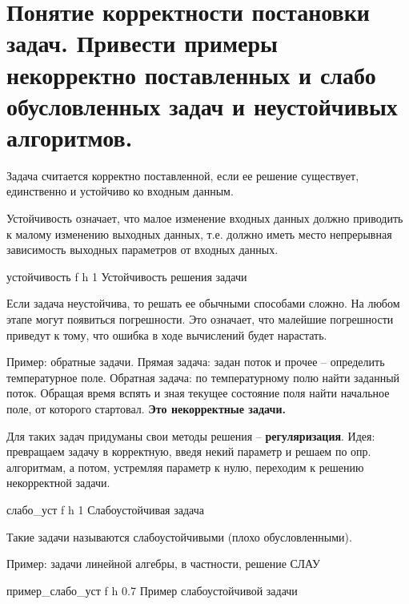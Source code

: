 \section*{Понятие корректности постановки задач. Привести примеры некорректно поставленных и слабо обусловленных задач и неустойчивых алгоритмов.} %

Задача считается корректно поставленной, если ее решение существует, единственно и устойчиво ко входным данным.

Устойчивость означает, что малое изменение входных данных должно приводить к малому изменению выходных данных, т.е. должно иметь место непрерывная зависимость выходных параметров от входных данных.

{устойчивость} %
{f} %
{h} %
{1\textwidth} %
{Устойчивость решения задачи} %

Если задача неустойчива, то решать ее обычными способами сложно. На любом этапе могут появиться погрешности. Это означает, что малейшие погрешности приведут к тому, что ошибка в ходе вычислений будет нарастать.

Пример: обратные задачи. Прямая задача: задан поток и прочее -- определить температурное поле. Обратная задача: по температурному полю найти заданный поток. Обращая время вспять и зная текущее состояние поля найти начальное поле, от которого стартовал. \textbf{Это некорректные задачи.}

Для таких задач придуманы свои методы решения -- \textbf{регуляризация}. Идея: превращаем задачу в корректную, введя некий параметр и решаем по опр. алгоритмам, а потом, устремляя параметр к нулю, переходим к решению некорректной задачи. 

{слабо_уст} %
{f} %
{h} %
{1\textwidth} %
{Слабоустойчивая задача}

Такие задачи называются слабоустойчивыми (плохо обусловленными).

Пример: задачи линейной алгебры, в частности, решение СЛАУ
 
{пример_слабо_уст} %
{f} %
{h} %
{0.7\textwidth} %
{Пример слабоустойчивой задачи}

